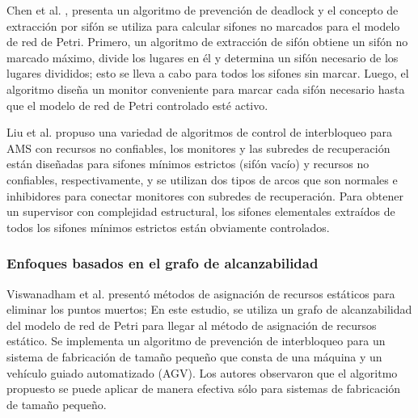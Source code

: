 Chen et al. \cite{paperchen}, presenta un algoritmo de prevención de deadlock y el concepto de extracción por sifón se utiliza para calcular sifones no marcados para el modelo de red de Petri. Primero, un algoritmo de extracción de sifón obtiene un sifón no marcado máximo, divide los lugares en él y determina un sifón necesario de los lugares divididos; esto se lleva a cabo para todos los sifones sin marcar. Luego, el algoritmo diseña un monitor conveniente para marcar cada sifón necesario hasta que el modelo de red de Petri controlado esté activo.

Liu et al. \cite{LiuanLi2013} propuso una variedad de algoritmos de control de interbloqueo para AMS con recursos no confiables, los monitores y las subredes de recuperación están diseñadas para sifones mínimos estrictos (sifón vacío) y recursos no confiables, respectivamente, y se utilizan dos tipos de arcos que son normales e inhibidores para conectar monitores con subredes de recuperación. Para obtener un supervisor con complejidad estructural, los sifones elementales extraídos de todos los sifones mínimos estrictos están obviamente controlados. 


\subsubsection{Enfoques basados en el grafo de alcanzabilidad}
Viswanadham et al. \cite{Viswanadham} presentó métodos de asignación de recursos estáticos para eliminar los puntos muertos; En este estudio, se utiliza un grafo de alcanzabilidad del modelo de red de Petri para llegar al método de asignación de recursos estático. Se implementa un algoritmo de prevención de interbloqueo para un sistema de fabricación de tamaño pequeño que consta de una máquina y un vehículo guiado automatizado (AGV). Los autores observaron que el algoritmo propuesto se puede aplicar de manera efectiva sólo para sistemas de fabricación de tamaño pequeño.

